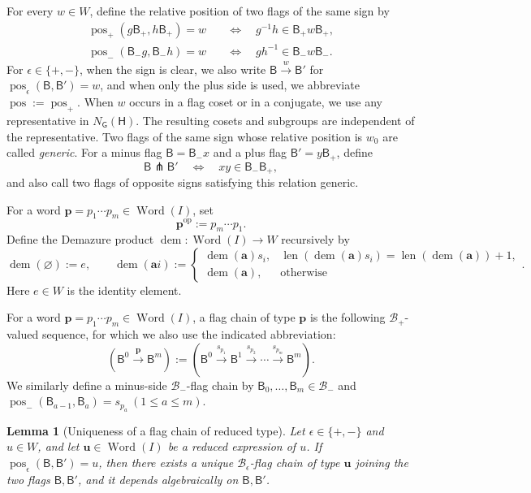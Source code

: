 \documentclass[10pt,a4paper]{article}
\newtheorem{lemma}[theorem]{Lemma}
\theoremstyle{definition}
\theoremstyle{remark}
\newcommand{\Bplus}{\mathcal B_+}
\newcommand{\Bminus}{\mathcal B_-}
\newcommand{\flagB}{\mathsf{B}}
\newcommand{\groupG}{\mathsf{G}}
\newcommand{\borelB}{\mathsf{B}}
\newcommand{\torusH}{\mathsf{H}}
\newcommand{\pos}{\operatorname{pos}}
\newcommand{\len}{\operatorname{len}}
\newcommand{\Word}{\operatorname{Word}}
\begin{document}
For every \(w\in W\), define the relative position of two flags of the same
sign by
\[
 \begin{aligned}
  \pos_+(g\borelB_+,h\borelB_+)=w
  &\quad\Longleftrightarrow\quad
  g^{-1}h\in\borelB_+w\borelB_+,\\
  \pos_-(\borelB_-g,\borelB_-h)=w
  &\quad\Longleftrightarrow\quad
  gh^{-1}\in\borelB_-w\borelB_-.
 \end{aligned}
\]
For \(\epsilon\in\{+,-\}\), when the sign is clear, we also write
\(\flagB\xrightarrow{w}\flagB'\) for
\(\pos_\epsilon(\flagB,\flagB')=w\), and when only the plus side is used, we
abbreviate \(\pos:=\pos_+\).  When \(w\) occurs in a flag coset or in a
conjugate, we use any representative in \(N_{\groupG}(\torusH)\).  The
resulting cosets and subgroups are independent of the representative.  Two
flags of the same sign whose relative position is \(w_0\) are called
\emph{generic}.  For a minus flag \(\flagB=\borelB_-x\) and a plus flag
\(\flagB'=y\borelB_+\), define
\[
 \flagB\pitchfork \flagB'
 \quad\Longleftrightarrow\quad
 xy\in \borelB_-\borelB_+,
\]
and also call two flags of opposite signs satisfying this relation generic.

For a word \(\mathbf p=p_1\cdots p_m\in\Word(I)\), set
\[
 \mathbf p^{\mathrm{op}}:=p_m\cdots p_1.
\]
Define the Demazure product \(\operatorname{dem}:\Word(I)\to W\) recursively by
\[
 \operatorname{dem}(\varnothing):=e,\qquad
 \operatorname{dem}(\mathbf a i):=
 \begin{cases}
  \operatorname{dem}(\mathbf a)s_i,
  &\len(\operatorname{dem}(\mathbf a)s_i)=\len(\operatorname{dem}(\mathbf a))+1,\\
  \operatorname{dem}(\mathbf a),&\text{otherwise}
 \end{cases}.
\]
Here \(e\in W\) is the identity element.

For a word \(\mathbf p=p_1\cdots p_m\in\Word(I)\), a flag chain of type
\(\mathbf p\) is the following \(\Bplus\)-valued sequence, for which we also
use the indicated abbreviation:
\[
 (\flagB^0\xrightarrow{\mathbf p}\flagB^m)
 :=
  (\flagB^0\xrightarrow{s_{p_1}}\flagB^1
  \xrightarrow{s_{p_2}}\cdots
  \xrightarrow{s_{p_m}}\flagB^m).
\]
We similarly define a minus-side \(\Bminus\)-flag chain by
\(\flagB_0,\ldots,\flagB_m\in\Bminus\) and
\(\pos_-(\flagB_{a-1},\flagB_a)=s_{p_a}\ (1\le a\le m)\).

\begin{lemma}[Uniqueness of a flag chain of reduced type]
\label{lem:reduced-flag-chain}
Let \(\epsilon\in\{+,-\}\) and \(u\in W\), and let
\(\mathbf u\in\Word(I)\) be a reduced expression of \(u\).  If
\(\pos_\epsilon(\flagB,\flagB')=u\), then there exists a unique
\(\mathcal B_\epsilon\)-flag chain of type \(\mathbf u\) joining the two flags
\(\flagB,\flagB'\), and it depends algebraically on
\(\flagB,\flagB'\).
\end{lemma}
\end{document}
